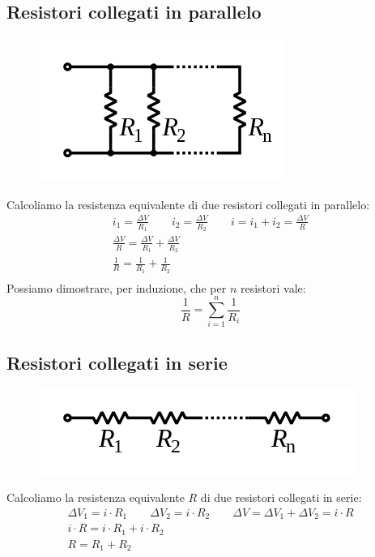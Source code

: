 \subsection{Resistori collegati in parallelo}
\begin{figure}[h!]
	\centering
    \includegraphics[scale=0.5]{Pictures/resistori-parallelo}
\end{figure}
Calcoliamo la resistenza equivalente di due resistori collegati in parallelo:
\begin{displaymath}\begin{aligned}
	i_1 = \frac{\Delta V}{R_1} \qquad i_2 = \frac{\Delta V}{R_2} \qquad i = i_1 + i_2 = \frac{\Delta V}{R}\\
    \frac{\Delta V}{R} = \frac{\Delta V}{R_1} + \frac{\Delta V}{R_2}\\
    \frac{1}{R} = \frac{1}{R_1} + \frac{1}{R_2}\\
\end{aligned}\end{displaymath}
Possiamo dimostrare, per induzione, che per $n$ resistori vale:
\begin{displaymath}
	\frac{1}{R} = \sum_{i=1}^n \frac{1}{R_i}
\end{displaymath}

\subsection{Resistori collegati in serie}
\begin{figure}[h!]
	\centering
    \includegraphics[scale=0.5]{Pictures/resistori-serie}
\end{figure}
Calcoliamo la resistenza equivalente $R$ di due resistori collegati in serie:
\begin{displaymath}\begin{aligned}
	\Delta V_1 = i \cdot R_1 \qquad \Delta V_2 = i \cdot R_2 \qquad \Delta V = \Delta V_1 + \Delta V_2 = i \cdot R \\ 
    i \cdot R = i \cdot R_1 + i\cdot R_2\\
    R = R_1 + R_2
\end{aligned}\end{displaymath}

